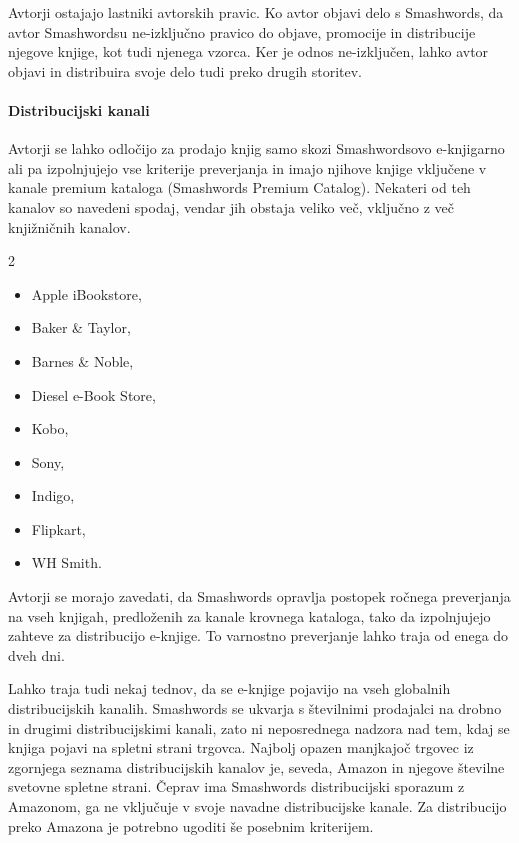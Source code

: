 \documentclass[a4paper, 12pt]{book}
\begin{document}
Avtorji ostajajo lastniki avtorskih pravic. Ko avtor objavi delo s Smashwords, da avtor Smashwordsu ne-izključno pravico do objave, promocije in distribucije njegove knjige, kot tudi njenega vzorca. Ker je odnos ne-izključen, lahko avtor objavi in distribuira svoje delo tudi preko drugih storitev.

\paragraph{Distribucijski kanali}
Avtorji se lahko odločijo za prodajo knjig samo skozi Smashwordsovo e-knjigarno ali pa izpolnjujejo vse kriterije preverjanja in imajo njihove knjige vključene v kanale premium kataloga (Smashwords Premium Catalog). Nekateri od teh kanalov so navedeni spodaj, vendar jih obstaja veliko več, vključno z več knjižničnih kanalov. 
\begin{multicols}{2}
	\begin{itemize}
		\item Apple iBookstore,
		\item Baker \& Taylor,
		\item Barnes \& Noble,
		\item Diesel e-Book Store,
		\item Kobo,
		\item Sony,
		\item Indigo,
		\item Flipkart,
		\item WH Smith.
	\end{itemize}
\end{multicols}

Avtorji se morajo zavedati, da Smashwords opravlja postopek ročnega preverjanja na vseh knjigah, predloženih za kanale krovnega kataloga, tako da izpolnjujejo zahteve za distribucijo e-knjige. To varnostno preverjanje lahko traja od enega do dveh dni.

Lahko traja tudi nekaj tednov, da se e-knjige pojavijo na vseh globalnih distribucijskih kanalih. Smashwords se ukvarja s številnimi prodajalci na drobno in drugimi distribucijskimi kanali, zato ni neposrednega nadzora nad tem, kdaj se knjiga pojavi na spletni strani trgovca. Najbolj opazen manjkajoč trgovec iz zgornjega seznama distribucijskih kanalov je, seveda, Amazon in njegove številne svetovne spletne strani. Čeprav ima Smashwords distribucijski sporazum z Amazonom, ga ne vključuje v svoje navadne distribucijske kanale. Za distribucijo preko Amazona je potrebno ugoditi še posebnim kriterijem. \cite{103}
\end{document}
